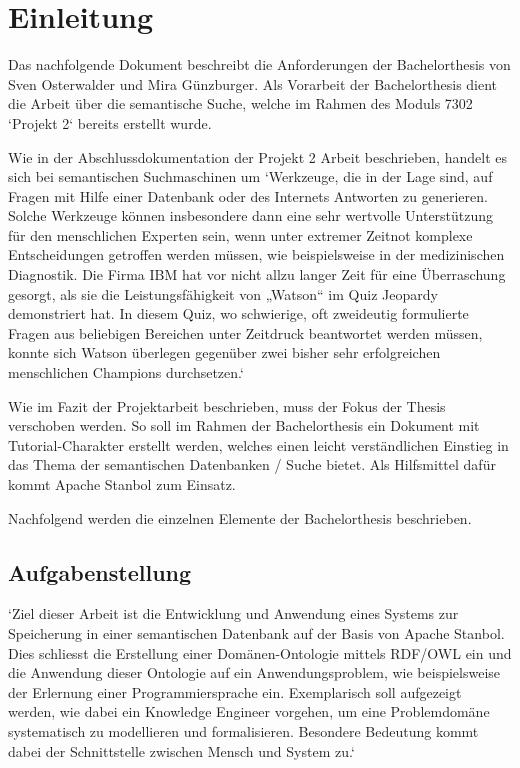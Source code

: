 \chapter{Einleitung}
\label{chap:einleitung}

Das nachfolgende Dokument beschreibt die Anforderungen der Bachelorthesis von Sven Osterwalder und Mira Günzburger. Als Vorarbeit der Bachelorthesis dient die Arbeit über die semantische Suche, welche im Rahmen des Moduls 7302 `Projekt 2` bereits erstellt wurde.

Wie in der Abschlussdokumentation der Projekt 2 Arbeit beschrieben, handelt es sich bei semantischen  Suchmaschinen um `Werkzeuge, die in der Lage sind, auf Fragen mit Hilfe einer Datenbank oder des Internets Antworten zu generieren. Solche Werkzeuge können insbesondere dann eine sehr wertvolle Unterstützung für den menschlichen Experten sein, wenn unter extremer Zeitnot komplexe Entscheidungen getroffen werden müssen, wie beispielsweise in der medizinischen Diagnostik. Die Firma IBM hat vor nicht allzu langer Zeit für eine Überraschung gesorgt, als sie die Leistungsfähigkeit von „Watson“ im Quiz Jeopardy demonstriert hat. In diesem Quiz, wo schwierige, oft zweideutig formulierte Fragen aus beliebigen Bereichen unter Zeitdruck beantwortet werden müssen, konnte sich Watson überlegen gegenüber zwei bisher sehr erfolgreichen menschlichen Champions durchsetzen.`
\cite{projekt2Doc}

Wie im Fazit der Projektarbeit beschrieben, muss der Fokus der Thesis verschoben werden. So soll im Rahmen der Bachelorthesis ein Dokument mit Tutorial-Charakter erstellt werden, welches einen leicht verständlichen Einstieg in das Thema der semantischen Datenbanken / Suche bietet. Als Hilfsmittel dafür kommt Apache Stanbol zum Einsatz.

Nachfolgend werden die einzelnen Elemente der Bachelorthesis beschrieben.

\section{Aufgabenstellung}
\label{sec:Aufgabenstellung}
`Ziel dieser Arbeit ist die Entwicklung und Anwendung eines Systems zur Speicherung in einer semantischen Datenbank auf der Basis von Apache Stanbol. Dies schliesst die Erstellung einer Domänen-Ontologie mittels RDF/OWL ein und die Anwendung dieser Ontologie auf ein Anwendungsproblem, wie beispielsweise der Erlernung einer Programmiersprache ein. Exemplarisch soll aufgezeigt werden, wie dabei ein Knowledge Engineer vorgehen, um eine Problemdomäne systematisch zu modellieren und formalisieren. Besondere Bedeutung kommt dabei der Schnittstelle zwischen Mensch und System zu.`~\cite{Aufgabenstellung}

